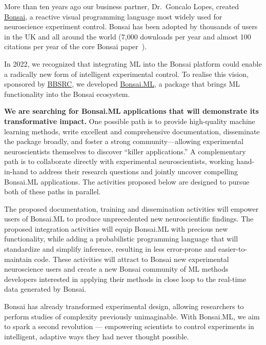 More than ten years ago our business partner, Dr.~Goncalo Lopes, created
\href{https://bonsai-rx.org/}{Bonsai}, a reactive visual programming
language most widely used for neuroscience experiment control.
%
Bonsai has been adopted by thousands of users in the UK and all around the
world (7,000 downloads per year and almost 100 citations per year of the core Bonsai
paper~\citep{lopesEtAl15}).

In 2022, we recognized that integrating ML into the Bonsai platform could
enable a radically new form of intelligent experimental control.
%
To realise this vision, sponsored by
\href{https://gow.bbsrc.ukri.org/grants/AwardDetails.aspx?FundingReference=BB\%2FW019132\%2F1}{BBSRC},
we developed \href{https://bonsai-rx.org/machinelearning}{Bonsai.ML}, a package
that brings ML functionality into the Bonsai ecosystem.

\textbf{We are searching for Bonsai.ML applications that will demonstrate its
transformative impact.}
%
One possible path is to provide high-quality machine learning methods, write
excellent and comprehensive documentation, disseminate the package broadly, and
foster a strong community—allowing experimental neuroscientists themselves to
discover “killer applications.”
%
A complementary path is to collaborate directly with experimental
neuroscientists, working hand-in-hand to address their research questions and
jointly uncover compelling Bonsai.ML applications.
%
The activities proposed below are designed to pursue both of these paths in
parallel.

The proposed documentation, training and dissemination activities will empower
users of Bonsai.ML to produce unprecedented new neuroscientific findings. The
proposed integration activities will equip Bonsai.ML with precious new
functionality, while adding a probabilistic programming language that will
standardize and simplify inference, resulting in less error-prone and
easier-to-maintain code.
%
These activities will attract to Bonsai new experimental neuroscience users and
create a new Bonsai community of ML methods developers interested in applying
their methods in close loop to the real-time data generated by Bonsai.

Bonsai has already transformed experimental design, allowing researchers to
perform studies of complexity previously unimaginable. With Bonsai.ML, we aim
to spark a second revolution — empowering scientists to control experiments in
intelligent, adaptive ways they had never thought possible.
